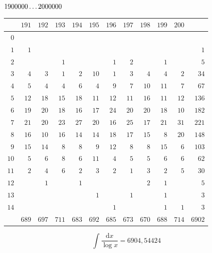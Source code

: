 \par\medskip
\noindent\begin{minipage}{\linewidth}\centering
{}
\(1900000\mathinner{.\,.\,.}2000000\)\par\smallskip
\begingroup\fontsize{10.5}{11.5}\selectfont\setlength{\tabcolsep}{3.5pt}\renewcommand{\arraystretch}{1}
\begin{tabular}{r|rrrrrrrrrr|r}\hline
 & $191$ & $192$ & $193$ & $194$ & $195$ & $196$ & $197$ & $198$ & $199$ & $200$ &  \\ \hline
$0$ &  &  &  &  &  &  &  &  &  &  &  \\
$1$ & $1$ &  &  &  &  &  &  &  &  &  & $1$ \\
$2$ &  &  & $1$ &  &  & $1$ & $2$ &  & $1$ &  & $5$ \\
$3$ & $4$ & $3$ & $1$ & $2$ & $10$ & $1$ & $3$ & $4$ & $4$ & $2$ & $34$ \\
$4$ & $5$ & $4$ & $4$ & $6$ & $4$ & $9$ & $7$ & $10$ & $11$ & $7$ & $67$ \\
$5$ & $12$ & $18$ & $15$ & $18$ & $11$ & $12$ & $11$ & $16$ & $11$ & $12$ & $136$ \\
$6$ & $19$ & $20$ & $18$ & $16$ & $17$ & $24$ & $20$ & $20$ & $18$ & $10$ & $182$ \\
$7$ & $21$ & $20$ & $23$ & $27$ & $20$ & $16$ & $25$ & $17$ & $21$ & $31$ & $221$ \\
$8$ & $16$ & $10$ & $16$ & $14$ & $14$ & $18$ & $17$ & $15$ & $8$ & $20$ & $148$ \\
$9$ & $15$ & $14$ & $8$ & $8$ & $9$ & $12$ & $8$ & $8$ & $15$ & $6$ & $103$ \\
$10$ & $5$ & $6$ & $8$ & $6$ & $11$ & $4$ & $5$ & $5$ & $6$ & $6$ & $62$ \\
$11$ & $2$ & $4$ & $6$ & $2$ & $3$ & $2$ & $1$ & $3$ & $2$ & $5$ & $30$ \\
$12$ &  & $1$ &  & $1$ &  &  &  & $2$ & $1$ &  & $5$ \\
$13$ &  &  &  &  & $1$ &  & $1$ &  & $1$ &  & $3$ \\
$14$ &  &  &  &  &  & $1$ &  &  & $1$ & $1$ & $3$ \\
\hline
 & $689$ & $697$ & $711$ & $683$ & $692$ & $685$ & $673$ & $670$ & $688$ & $714$ & $6902$ \\ \hline
\end{tabular}\par\endgroup
\setlength{\abovedisplayskip}{6pt}\setlength{\belowdisplayskip}{4pt}
\[\int\frac{\mathrm{d}x}{\log x}=6904{,}54424\]
\end{minipage}\par

